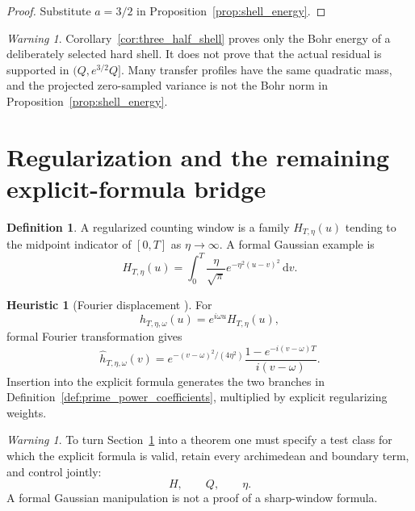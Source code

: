 \documentclass[11pt]{amsart}
\numberwithin{equation}{section}
\theoremstyle{plain}
\theoremstyle{definition}
\newtheorem{definition}[theorem]{Definition}
\newtheorem{heuristic}[theorem]{Heuristic}
\theoremstyle{remark}
\newtheorem{warning}[theorem]{Warning}
\newcommand{\1}{\mathbf{1}}
\newcommand{\dd}{\,\mathrm{d}}
\begin{document}
\begin{proof}
Substitute \(a=3/2\) in Proposition~\ref{prop:shell_energy}.
\end{proof}

\begin{warning}
\label{warn:no_shell_localization}
Corollary~\ref{cor:three_half_shell} proves only the Bohr energy of a
deliberately selected hard shell.  It does not prove that the actual
residual is supported in \((Q,e^{3/2}Q]\).  Many transfer profiles have
the same quadratic mass, and the projected zero-sampled variance is not
the Bohr norm in Proposition~\ref{prop:shell_energy}.
\end{warning}

\section{Regularization and the remaining explicit-formula bridge}
\label{sec:regularization_bridge}

\begin{definition}
\label{def:regularized_window}
A regularized counting window is a family
\(H_{T,\eta}(u)\) tending to the midpoint indicator of \([0,T]\) as
\(\eta\to\infty\).  A formal Gaussian example is
\begin{equation}
H_{T,\eta}(u)
=
\int_0^T
\frac{\eta}{\sqrt\pi}
e^{-\eta^2(u-v)^2}\dd v.
\label{eq:gaussian_window}
\end{equation}
\end{definition}

\begin{heuristic}[Fourier displacement {\normalfont[Heuristic]}]
\label{heur:gaussian_fourier}
For
\begin{equation}
h_{T,\eta,\omega}(u)
=
e^{i\omega u}H_{T,\eta}(u),
\label{eq:gaussian_test}
\end{equation}
formal Fourier transformation gives
\begin{equation}
\widehat h_{T,\eta,\omega}(v)
=
e^{-(v-\omega)^2/(4\eta^2)}
\frac{1-e^{-i(v-\omega)T}}{i(v-\omega)}.
\label{eq:gaussian_fourier}
\end{equation}
Insertion into the explicit formula generates the two branches in
Definition~\ref{def:prime_power_coefficients}, multiplied by explicit
regularizing weights.
\end{heuristic}

\begin{warning}
\label{warn:regularization_requirements}
To turn Section~\ref{sec:regularization_bridge} into a theorem one must
specify a test class for which the explicit formula is valid, retain every
archimedean and boundary term, and control jointly:
\begin{equation}
H,\qquad Q,\qquad\eta.
\label{eq:joint_parameters}
\end{equation}
A formal Gaussian manipulation is not a proof of a sharp-window formula.
\end{warning}
\end{document}
